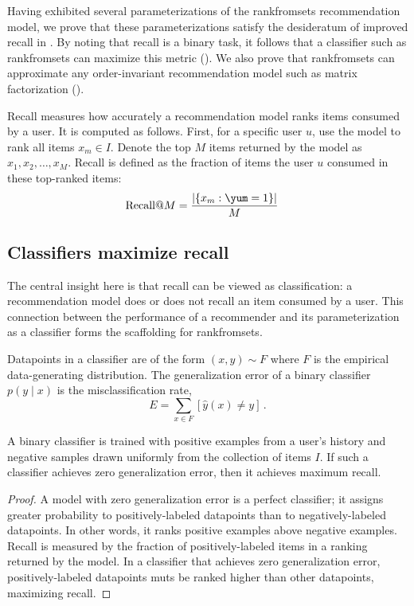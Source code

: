 Having exhibited several parameterizations of the \acrshort{rankfromsets}
recommendation model, we prove that these parameterizations satisfy the
desideratum of improved recall in . By noting that recall
is a binary task, it follows that a classifier such as \acrshort{rankfromsets}
can maximize this metric (). We also prove that
\acrshort{rankfromsets} can approximate any order-invariant recommendation model
such as matrix factorization ().

Recall measures how accurately a recommendation model ranks items consumed by a
user. It is computed as follows. First, for a specific user $u$, use the model
to rank all items $x_m \in I$. Denote the top $M$ items returned by the model as
${x_1, x_2, \ldots, x_M}$. Recall is defined as the fraction of items the user
$u$ consumed in these top-ranked items:
\begin{align}
  \textrm{Recall@}M &= \frac{\lvert \{x_m : \yum = 1 \} \rvert }{M}
\label{eq:recall}                      
\end{align}

\subsection{Classifiers maximize recall}
\label{sec:optimal}

The central insight here is that recall can be viewed as classification: a
recommendation model does or does not recall an item consumed by a user. This
connection between the performance of a recommender and its parameterization as
a classifier forms the scaffolding for \acrshort{rankfromsets}.

Datapoints in a classifier are of the form $(x, y) \sim F$ where $F$ is the
empirical data-generating distribution. The generalization error of a binary
classifier $p(y \mid x)$ is the misclassification rate,
\begin{equation}
E = \sum_{x \in F} \left[ \hat y(x) \neq y \right] \, .
\end{equation}
\begin{proposition}
  A binary classifier is trained with positive examples from a user's history
  and negative samples drawn uniformly from the collection of items $I$. If such
  a classifier achieves zero generalization error, then it achieves maximum
  recall.
  \label{prop:1}
\end{proposition}
\begin{proof}
  A model with zero generalization error is a perfect classifier; it assigns
  greater probability to positively-labeled datapoints than to
  negatively-labeled datapoints. In other words, it ranks positive examples
  above negative examples. Recall is measured by the fraction of
  positively-labeled items in a ranking returned by the model. In a classifier
  that achieves zero generalization error, positively-labeled datapoints muts be
  ranked higher than other datapoints, maximizing recall.
\end{proof}

